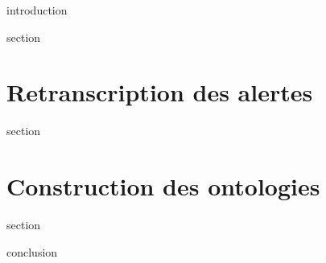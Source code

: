 \chaptertoc{}

\label{sec:5-int}
{introduction}

{section}

\section{Retranscription des alertes}
\label{sec:5-1}
{section}

\section{Construction des ontologies}
\label{sec:5-2}
{section}

\label{sec:5-cnc}
{conclusion}


